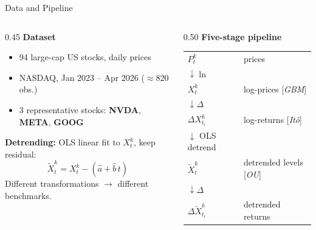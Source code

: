 \documentclass[aspectratio=169,10pt]{beamer}
\begin{document}
\begin{frame}{Data and Pipeline}

\begin{columns}[T]
\begin{column}{0.45\textwidth}
\textbf{Dataset}
\begin{itemize}\setlength{\itemsep}{1pt}
  \item 94 large-cap US stocks, daily prices
  \item NASDAQ, Jan 2023 -- Apr 2026 ($\approx\!820$ obs.)
  \item 3 representative stocks:
        \textbf{NVDA}, \textbf{META}, \textbf{GOOG}
\end{itemize}

\smallskip
\textbf{Detrending:} OLS linear fit to $X_t^k$, keep residual:
\vspace{-4pt}\[ \widetilde{X}_{t}^k = X_{t}^k - (\hat a + \hat b\, t) \]\vspace{-4pt}
\small Different transformations $\to$ different benchmarks.
\end{column}
\begin{column}{0.50\textwidth}
\textbf{Five-stage pipeline}

\smallskip
\renewcommand{\arraystretch}{1.25}
\begin{tabular}{@{}ll@{}}
$P_{t}^{k}$ & prices \\
$\downarrow \ln$ & \\
$X_{t}^{k}$ & log-prices \;\small[\textit{GBM}] \\
$\downarrow \Delta$ & \\
$\Delta X_{t_i}^{k}$ & log-returns \;\small[\textit{It\^{o}}] \\
$\downarrow$ OLS detrend & \\
$\widetilde{X}_{t}^{k}$ & detrended levels \;\small[\textit{OU}] \\
$\downarrow \Delta$ & \\
$\Delta\widetilde{X}_{t_i}^{k}$ & detrended returns \\
\end{tabular}
\end{column}
\end{columns}

\end{frame}
\end{document}
